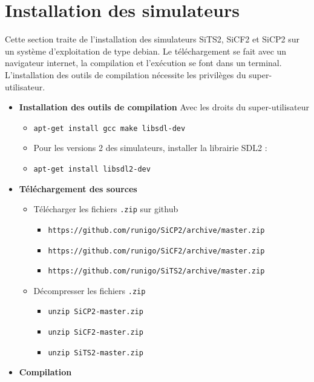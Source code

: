 \section{Installation des simulateurs}
Cette section traite de l'installation des simulateurs SiTS2, SiCF2 et SiCP2 sur un système d'exploitation de type debian. Le téléchargement se fait avec un navigateur internet, la compilation et l'exécution se font dans un terminal. L'installation des outils de compilation nécessite les privilèges du super-utilisateur.
\begin{itemize}[leftmargin=1cm, label=, itemsep=0pt]
\item {\bf Installation des outils de compilation}
Avec les droits du super-utilisateur
	\begin{itemize}[leftmargin=1cm, label=, itemsep=0pt]
	\item \texttt{apt-get install gcc make libsdl-dev}
	\item Pour les versions 2 des simulateurs, installer la librairie SDL2 :
	\item \texttt{apt-get install libsdl2-dev}
	\end{itemize}
\item {\bf Téléchargement des sources}
	\begin{itemize}[leftmargin=1cm, label=, itemsep=0pt]
	\item Télécharger les fichiers \texttt{.zip} sur github
		\begin{itemize}[leftmargin=1cm, label=, itemsep=0pt]
		\item \texttt{https://github.com/runigo/SiCP2/archive/master.zip}
		\item \texttt{https://github.com/runigo/SiCF2/archive/master.zip}
		\item \texttt{https://github.com/runigo/SiTS2/archive/master.zip}
		\end{itemize}
	\item Décompresser les fichiers \texttt{.zip}
		\begin{itemize}[leftmargin=1cm, label=, itemsep=0pt]
		\item \texttt{unzip SiCP2-master.zip}
		\item \texttt{unzip SiCF2-master.zip}
		\item \texttt{unzip SiTS2-master.zip}
		\end{itemize}
	\end{itemize}
\item {\bf Compilation}
	\begin{itemize}[leftmargin=1cm, label=, itemsep=0pt]

\end{itemize}
\end{itemize}
